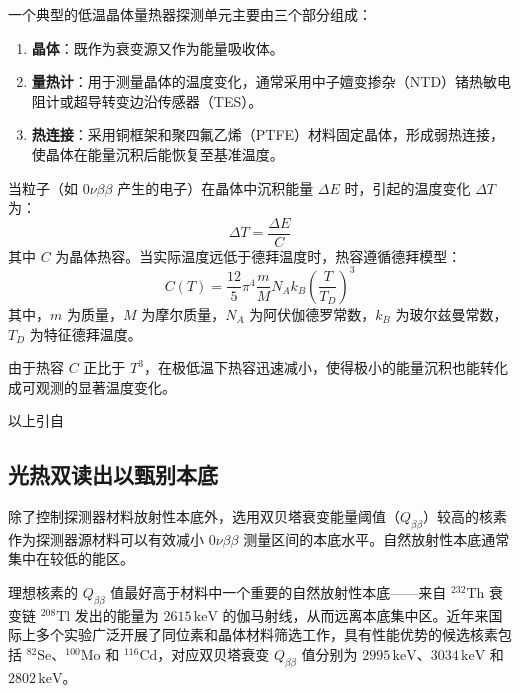 \documentclass[type=master]{fduthesis}
\begin{document}
一个典型的低温晶体量热器探测单元主要由三个部分组成：
\begin{enumerate}
    \item \textbf{晶体}：既作为衰变源又作为能量吸收体。
    \item \textbf{量热计}：用于测量晶体的温度变化，通常采用中子嬗变掺杂（NTD）锗热敏电阻计或超导转变边沿传感器（TES）。
    \item \textbf{热连接}：采用铜框架和聚四氟乙烯（PTFE）材料固定晶体，形成弱热连接，使晶体在能量沉积后能恢复至基准温度。
\end{enumerate}

当粒子（如 $0\nu\beta\beta$ 产生的电子）在晶体中沉积能量 $\Delta E$ 时，引起的温度变化 $\Delta T$ 为：
\begin{equation}
    \Delta T = \frac{\Delta E}{C}
\end{equation}
其中 $C$ 为晶体热容。当实际温度远低于德拜温度时，热容遵循德拜模型：
\begin{equation}
    C(T) = \frac{12}{5} \pi^4 \frac{m}{M} N_A k_B \left( \frac{T}{T_D} \right)^3
\end{equation}
其中，$m$ 为质量，$M$ 为摩尔质量，$N_A$ 为阿伏伽德罗常数，$k_B$ 为玻尔兹曼常数，$T_D$ 为特征德拜温度。

由于热容 $C$ 正比于 $T^3$，在极低温下热容迅速减小，使得极小的能量沉积也能转化成可观测的显著温度变化。

{\color{blue} 以上引自}\cite{Cao2025Jinping} 











\subsection{光热双读出以甄别本底}
除了控制探测器材料放射性本底外，选用双贝塔衰变能量阈值（$Q_{\beta\beta}$）较高的核素作为探测器源材料可以有效减小 $0\nu\beta\beta$ 测量区间的本底水平。自然放射性本底通常集中在较低的能区。

理想核素的 $Q_{\beta\beta}$ 值最好高于材料中一个重要的自然放射性本底——来自 $^{232}\mathrm{Th}$ 衰变链 $^{208}\mathrm{Tl}$ 发出的能量为 $2615\,\mathrm{keV}$ 的伽马射线，从而远离本底集中区。近年来国际上多个实验广泛开展了同位素和晶体材料筛选工作，具有性能优势的候选核素包括 $^{82}\mathrm{Se}$、$^{100}\mathrm{Mo}$ 和 $^{116}\mathrm{Cd}$，对应双贝塔衰变 $Q_{\beta\beta}$ 值分别为 $2995\,\mathrm{keV}$、$3034\,\mathrm{keV}$ 和 $2802\,\mathrm{keV}$。
\end{document}
